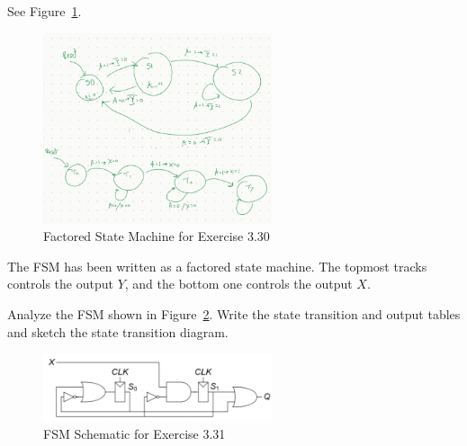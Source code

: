 \documentclass[12pt]{article}
\newenvironment{ex}[2][Exercise]{\begin{trivlist}
		\item[\hskip \labelsep {\bfseries #1}\hskip \labelsep {\bfseries #2.}]}{\end{trivlist}}
\newenvironment{sol}[1][Solution]{\begin{trivlist}
		\item[\hskip \labelsep {\bfseries #1:}]}{\end{trivlist}}
\begin{document}
\begin{sol}
	See Figure~\ref{03-30-factored-state-machine}.
	\begin{figure}
		\centering
		\includegraphics[width=0.6\textwidth]{03-30-factored-state-machine}
		\caption{Factored State Machine for Exercise 3.30}
		\label{03-30-factored-state-machine}
	\end{figure}
	The FSM has been written as a factored state machine. The topmost tracks controls
	the output $Y$, and the bottom one controls the output $X$.
\end{sol}

\begin{ex}{3.31}
	Analyze the FSM shown in Figure~\ref{03-31-circuit}.
	Write the state transition and output tables and sketch
	the state transition diagram.
	\begin{figure}
		\centering
		\includegraphics[width=0.6\textwidth]{03-31-circuit}
		\caption{FSM Schematic for Exercise 3.31}
		\label{03-31-circuit}
	\end{figure}
\end{ex}
\end{document}
